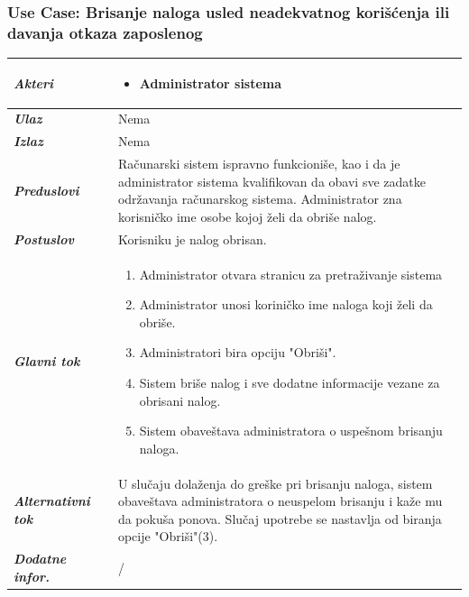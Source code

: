 \documentclass[20pt]{article}
\begin{document}
\subsubsection{\bfseries \large Use Case: Brisanje naloga usled neadekvatnog kori\v {s}\' cenja ili davanja otkaza zaposlenog}
\begin{center}
\begin{tabular}{p{0.23\linewidth} p{0.77\linewidth}}
 \hline
 {\it \bfseries Akteri} & \begin{itemize}
    \item Administrator sistema
\end{itemize}\\
\hline

 {\it \bfseries Ulaz} & Nema\\
 \hline
 
 {\it \bfseries Izlaz} & Nema\\
 \hline
 
 {\it \bfseries Preduslovi} & Ra\v {c}unarski sistem ispravno funkcioni\v {s}e, kao i da je administrator sistema kvalifikovan da obavi sve zadatke odr\v {z}avanja ra\v {c}unarskog sistema. Administrator zna korisni\v {c}ko ime osobe kojoj \v {z}eli da obri\v {s}e nalog.\\
 \hline
 
 {\it \bfseries Postuslov} & Korisniku je nalog obrisan.\\
 \hline

     {\it \bfseries Glavni tok} &  
     \begin{enumerate}
         \item Administrator otvara stranicu za pretra\v {z}ivanje sistema
         \item Administrator unosi korini\v {c}ko ime naloga koji \v {z}eli da obri\v {s}e.
         \item Administratori bira opciju "Obri\v {s}i".
         \item Sistem bri\v {s}e nalog i sve dodatne informacije vezane za obrisani nalog.
         \item Sistem obave\v {s}tava administratora o uspe\v {s}nom brisanju naloga.
    \end{enumerate}\\
 \hline
 {\it \bfseries Alternativni tok} & U slu\v {c}aju dola\v {z}enja do gre\v {s}ke pri brisanju naloga, sistem obave\v {s}tava administratora o neuspelom brisanju i ka\v {z}e mu da poku\v {s}a ponova. Slu\v {c}aj upotrebe se nastavlja od biranja opcije "Obri\v {s}i"(3).\\
 \hline
 {\it \bfseries Dodatne infor.} & /\\
 \hline

\end{tabular}
\end{center}
\end{document}
